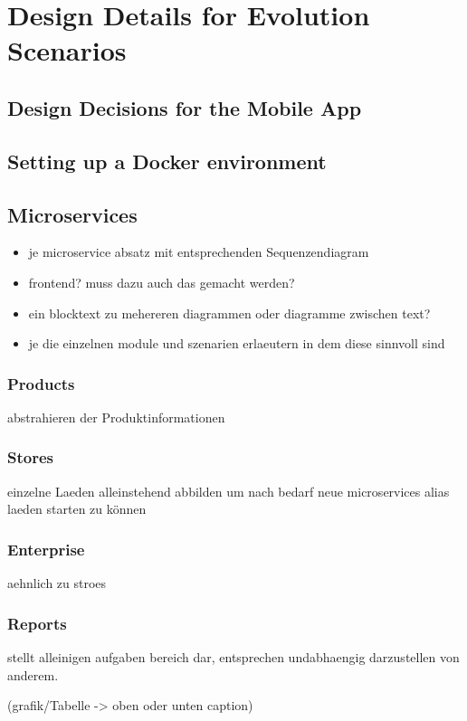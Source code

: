\section{Design Details for Evolution Scenarios}


\subsection{Design Decisions for the Mobile App}


\subsection{Setting up a Docker environment}
	
	
\subsection{Microservices}
	\begin{itemize}
		\item je microservice absatz mit entsprechenden Sequenzendiagram %
		\item frontend? muss dazu auch das gemacht werden?
		\item ein blocktext zu mehereren diagrammen oder diagramme zwischen text?
		
	
			\item je die einzelnen module und szenarien erlaeutern in dem diese sinnvoll sind
	\end{itemize}
	
		\subsubsection{Products}
		abstrahieren der Produktinformationen 
		
		\subsubsection{Stores}
		einzelne Laeden alleinstehend abbilden um nach bedarf neue microservices alias laeden starten zu können
		
		\subsubsection{Enterprise}
		aehnlich zu stroes
		
		\subsubsection{Reports}
		stellt alleinigen aufgaben bereich dar, entsprechen undabhaengig darzustellen von anderem.




	
	
(grafik/Tabelle  -> oben oder unten caption)